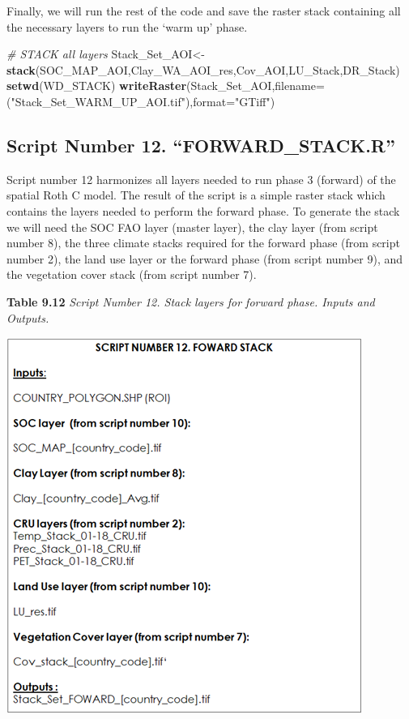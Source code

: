 \documentclass[
  10pt,
  b5paper,
]{book}
\newenvironment{Shaded}{\begin{snugshade}}{\end{snugshade}}
\newcommand{\CommentTok}[1]{\textcolor[rgb]{0.56,0.35,0.01}{\textit{#1}}}
\newcommand{\DataTypeTok}[1]{\textcolor[rgb]{0.13,0.29,0.53}{#1}}
\newcommand{\KeywordTok}[1]{\textcolor[rgb]{0.13,0.29,0.53}{\textbf{#1}}}
\newcommand{\NormalTok}[1]{#1}
\newcommand{\StringTok}[1]{\textcolor[rgb]{0.31,0.60,0.02}{#1}}
\begin{document}
Finally, we will run the rest of the code and save the raster stack containing all the necessary layers to run the `warm up' phase.

\begin{Shaded}
\begin{Highlighting}[]
\CommentTok{# STACK all layers}
\NormalTok{Stack_Set_AOI<-}\KeywordTok{stack}\NormalTok{(SOC_MAP_AOI,Clay_WA_AOI_res,Cov_AOI,LU_Stack,DR_Stack)}
\KeywordTok{setwd}\NormalTok{(WD_STACK)}
\KeywordTok{writeRaster}\NormalTok{(Stack_Set_AOI,}\DataTypeTok{filename=}\NormalTok{(}\StringTok{"Stack_Set_WARM_UP_AOI.tif"}\NormalTok{),}\DataTypeTok{format=}\StringTok{"GTiff"}\NormalTok{)}
\end{Highlighting}
\end{Shaded}

\hypertarget{script-number-12.-forward_stack.r}{%
\subsection{Script Number 12. ``FORWARD\_STACK.R''}\label{script-number-12.-forward_stack.r}}

Script number 12 harmonizes all layers needed to run phase 3 (forward) of the spatial Roth C model. The result of the script is a simple raster stack which contains the layers needed to perform the forward phase. To generate the stack we will need the SOC FAO layer (master layer), the clay layer (from script number 8), the three climate stacks required for the forward phase (from script number 2), the land use layer or the forward phase (from script number 9), and the vegetation cover stack (from script number 7).

\textbf{Table 9.12} \emph{Script Number 12. Stack layers for forward phase. Inputs and Outputs.}

\includegraphics{tables/Table_9.11.png}
\end{document}
